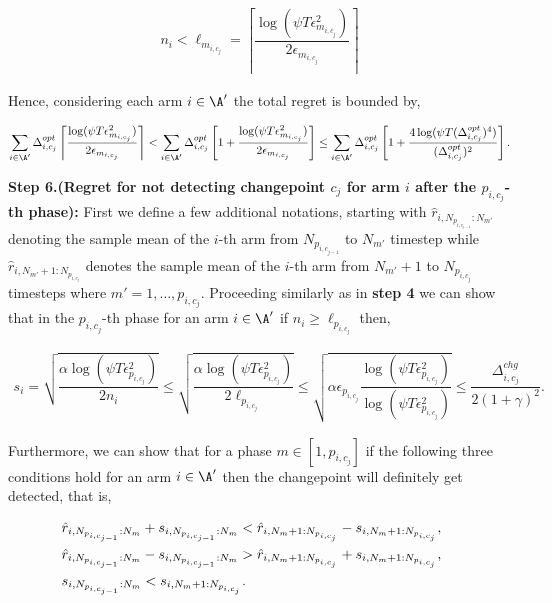 \begin{customproof}{3}
\begin{align*}
n_i < \ell_{m_{i,c_j}} = \left\lceil \dfrac{\log(\psi T\epsilon_{m_{i,c_j}}^2)}{2\epsilon_{m_{i,c_j}}} \right\rceil
\end{align*}

Hence, considering each arm $i\in\A'$ the total regret is bounded by,

\begin{align*}
\sum_{i\in\A'}\Delta^{opt}_{i,c_j}\left\lceil \dfrac{\log(\psi T\epsilon_{m_{i,c_j}}^2)}{2\epsilon_{m_{i,c_j}}} \right\rceil < \sum_{i\in\A'}\Delta^{opt}_{i,c_j}\left[ 1 + \dfrac{\log(\psi T\epsilon_{m_{i,c_j}}^2)}{2\epsilon_{m_{i,c_j}}} \right] \leq \sum_{i\in\A'}\Delta^{opt}_{i,c_j}\left[ 1 + \dfrac{4\log(\psi T(\Delta^{opt}_{i,c_j})^4)}{(\Delta^{opt}_{i,c_j})^2}\right].
\end{align*} 

\textbf{Step 6.(Regret for not detecting changepoint $c_{j}$ for arm $i$ after the $p_{i,c_j}$-th phase):} First we define a few additional notations, starting with $\hat{r}_{i,N_{p_{i,c_{j-1}}}:N_{m'}}$ denoting the sample mean of the $i$-th arm from $N_{p_{i,c_{j-1}}}$ to $N_{m'}$ timestep while $\hat{r}_{i,N_{m'}+1:N_{p_{i,c_j}}}$ denotes the sample mean of the $i$-th arm from $N_{m'}+1$ to $N_{p_{i,c_j}}$ timesteps where $m'=1,\ldots,p_{i,c_j}$. Proceeding similarly as in \textbf{step 4} we can show that in the $p_{i,c_j}$-th phase for an arm $i\in\A'$ if $n_{i}\geq\ell_{p_{i,c_j}}$ then,

\begin{align*}
s_i = \sqrt{\dfrac{\alpha\log(\psi T\epsilon_{p_{i,c_j}}^2)}{2n_{i}}} \leq \sqrt{\dfrac{\alpha\log(\psi T\epsilon_{p_{i,c_j}}^2)}{2\ell_{p_{i,c_j}}}} \leq \sqrt{\alpha\epsilon_{p_{i,c_j}}\dfrac{\log(\psi T\epsilon_{p_{i,c_j}}^2)}{\log(\psi T\epsilon_{p_{i,c_j}}^2)}} \leq \dfrac{\Delta^{chg}_{i,c_j}}{2(1+\gamma)^2}.
\end{align*}

Furthermore, we can show that for a phase $m\in[1,p_{i,c_j}]$ if the following three conditions hold for an arm $i\in\A'$ then the changepoint will definitely get detected, that is,

\begin{eqnarray}
&\hat{r}_{i,N_{p_{i,c_{j-1}}}:N_{m}} + s_{i,N_{p_{i,c_{j-1}}}:N_{m}} < \hat{r}_{i,N_{m}+1:N_{p_{i,c_j}}} - s_{i,N_{m}+1:N_{p_{i,c_j}}},\hspace*{4mm}
\nonumber\\
&\hat{r}_{i,N_{p_{i,c_{j-1}}}:N_{m}} - s_{i,N_{p_{i,c_{j-1}}}:N_{m}} > \hat{r}_{i,N_{m}+1:N_{p_{i,c_j}}} + s_{i,N_{m}+1:N_{p_{i,c_j}}},\hspace*{4mm} 
\nonumber\\
& s_{i,N_{p_{i,c_{j-1}}}:N_{m}} < s_{i,N_{m}+1:N_{p_{i,c_j}}} \label{eq:arm-pull-chg}.\\\nonumber
\end{eqnarray}


\end{customproof}
